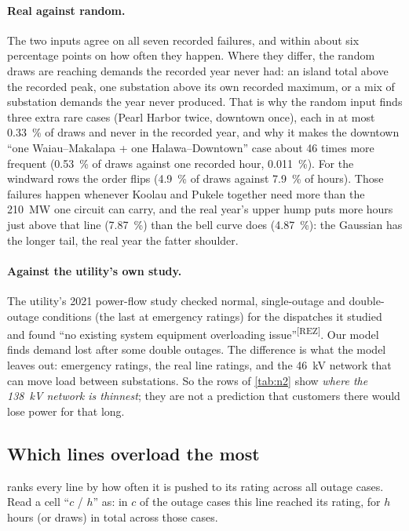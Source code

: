 \documentclass[11pt,a4paper]{article}
\newcommand{\src}[1]{\textsuperscript{[#1]}}
\begin{document}
\paragraph{Real against random.} The two inputs agree on all seven recorded failures,
and within about six percentage points on how often they happen. Where they differ, the
random draws are reaching demands the recorded year never had: an island total above
the recorded peak, one substation above its own recorded maximum, or a mix of
substation demands the year never produced. That is why the random input finds three
extra rare cases (Pearl Harbor twice, downtown once), each in at most
\SI{0.33}{\percent} of draws and never in the recorded year, and why it makes the
downtown ``one Waiau--Makalapa + one Halawa--Downtown'' case about 46 times more
frequent (\SI{0.53}{\percent} of draws against one recorded hour,
\SI{0.011}{\percent}). For the windward rows the order flips (\SI{4.9}{\percent} of
draws against \SI{7.9}{\percent} of hours). Those failures happen whenever Koolau and
Pukele together need more than the \SI{210}{MW} one circuit can carry, and the real
year's upper hump puts more hours just above that line (\SI{7.87}{\percent}) than the
bell curve does (\SI{4.87}{\percent}): the Gaussian has the longer tail, the real year
the fatter shoulder.

\paragraph{Against the utility's own study.} The utility's 2021 power-flow study
checked normal, single-outage and double-outage conditions (the last at emergency
ratings) for the dispatches it studied and found ``no existing system equipment
overloading issue''\src{REZ}. Our model finds demand lost after some double outages.
The difference is what the model leaves out: emergency ratings, the real line ratings,
and the \SI{46}{kV} network that can move load between substations. So the rows of
\cref{tab:n2} show \emph{where the \SI{138}{kV} network is thinnest}; they are not a
prediction that customers there would lose power for that long.

\subsection{Which lines overload the most}

 ranks every line by how often it is pushed to its rating across all
outage cases. Read a cell ``$c$ / $h$'' as: in $c$ of the outage cases this line
reached its rating, for $h$ hours (or draws) in total across those cases.
\end{document}
